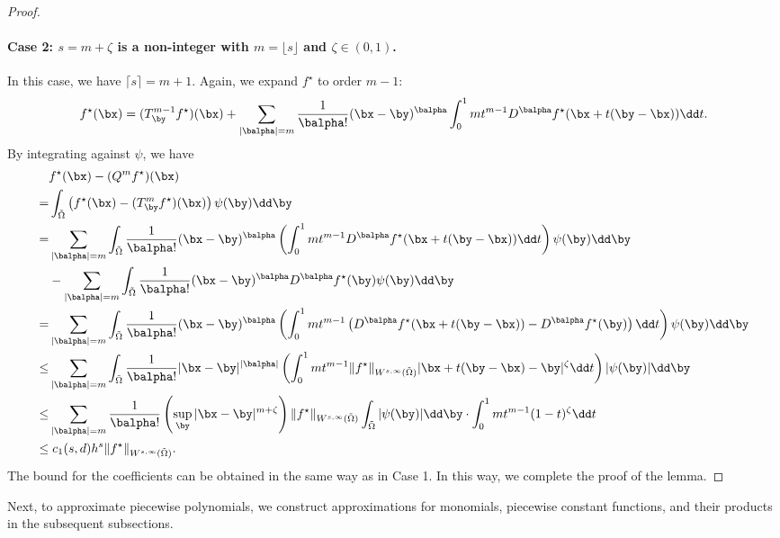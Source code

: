 \documentclass[11pt]{article}
\begin{document}
\begin{proof}
    \paragraph{Case 2: $s=m+\zeta$ is a non-integer with $m=\lfloor s \rfloor$ and $\zeta \in (0,1)$.} In this case, we have $\lceil s \rceil = m+1$. Again, we expand $f^{\star}$ to order $m-1$:
    \begin{equation*}
         f^{\star}(\bx) = (T^{m-1}_{\by} f^{\star})(\bx) + \sum_{|{\balpha}| = m} \frac{1}{{\balpha}!} (\bx - \by)^{\balpha} \int_0^1 m t^{m-1} D^{\balpha} f^{\star}(\bx + t(\by - \bx)) \dd t.
    \end{equation*}
    By integrating against $\psi$, we have
    \begin{equation*}
        \begin{aligned}
            &f^{\star}(\bx) - (Q^{m} f^{\star})(\bx)\\
            =& \int_{\tilde{\Omega}} \left( f^{\star}(\bx) - (T^{m}_{\by} f^{\star})(\bx) \right) \psi(\by) \dd \by \\
            =& \sum_{|{\balpha}| = m} \int_{\tilde{\Omega}} \frac{1}{{\balpha}!} (\bx - \by)^{\balpha} 
            \left(\int_0^1 m t^{m-1} D^{\balpha} f^{\star}(\bx + t(\by - \bx)) \dd t \right) \psi(\by) \dd \by\\
            &- \sum_{|{\balpha}| = m} \int_{\tilde{\Omega}} \frac{1}{{\balpha}!} (\bx - \by)^{\balpha} D^{\balpha} f^{\star}(\by) \psi(\by) \dd \by \\
            =& \sum_{|{\balpha}| = m} \int_{\tilde{\Omega}} \frac{1}{{\balpha}!} (\bx - \by)^{\balpha} 
            \left(\int_0^1 m t^{m-1} \left(D^{\balpha} f^{\star}(\bx + t(\by - \bx)) - D^{\balpha} f^{\star}(\by)\right) \dd t \right) \psi(\by) \dd \by\\
            \leq& \sum_{|{\balpha}| = m} \int_{\tilde{\Omega}} \frac{1}{{\balpha}!} |\bx - \by|^{|{\balpha}|}
            \left(\int_0^1 m t^{m-1} \|f^{\star}\|_{W^{s,\infty}(\tilde{\Omega})} |\bx + t(\by - \bx) - \by|^{\zeta} \dd t \right) |\psi(\by)| \dd \by\\
            \leq& \sum_{|{\balpha}| = m} \frac{1}{{\balpha}!} \left(\sup_{\by} |\bx-\by|^{m+\zeta}\right) \|f^{\star}\|_{W^{s,\infty}(\tilde{\Omega})} \int_{\tilde{\Omega}} |\psi(\by)| \dd \by \cdot \int_{0}^{1} m t^{m-1} (1 - t)^{\zeta} \dd t\\
            \leq&\; c_1{(s,d)} h^{s} \|f^{\star}\|_{W^{s,\infty}(\tilde{\Omega})}.
        \end{aligned}
    \end{equation*}
    The bound for the coefficients can be obtained in the same way as in Case 1. In this way, we complete the proof of the lemma.
\end{proof}
Next, to approximate piecewise polynomials, we construct approximations for monomials, piecewise constant functions, and their products in the subsequent subsections.
\end{document}
